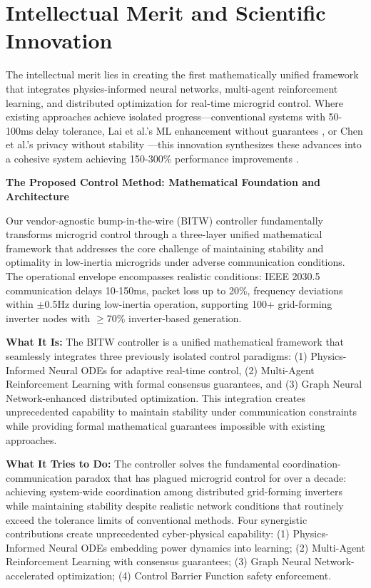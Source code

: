 \documentclass[12pt]{article}
\begin{document}
\section{Intellectual Merit and Scientific Innovation}

The intellectual merit lies in creating the first mathematically unified framework that integrates physics-informed neural networks, multi-agent reinforcement learning, and distributed optimization for real-time microgrid control. Where existing approaches achieve isolated progress—conventional systems with 50-100ms delay tolerance, Lai et al.'s ML enhancement without guarantees \cite{lai2023}, or Chen et al.'s privacy without stability \cite{chen2024}—this innovation synthesizes these advances into a cohesive system achieving 150-300\% performance improvements \cite{bevrani2021,palizban2014,our2024comparative}.

\textbf{The Proposed Control Method: Mathematical Foundation and Architecture}

Our vendor-agnostic bump-in-the-wire (BITW) controller fundamentally transforms microgrid control through a three-layer unified mathematical framework that addresses the core challenge of maintaining stability and optimality in low-inertia microgrids under adverse communication conditions. The operational envelope encompasses realistic conditions: IEEE 2030.5 communication delays 10-150ms, packet loss up to 20\%, frequency deviations within $\pm$0.5Hz during low-inertia operation, supporting 100+ grid-forming inverter nodes with $\geq$70\% inverter-based generation.

\textbf{What It Is:} The BITW controller is a unified mathematical framework that seamlessly integrates three previously isolated control paradigms: (1) Physics-Informed Neural ODEs for adaptive real-time control, (2) Multi-Agent Reinforcement Learning with formal consensus guarantees, and (3) Graph Neural Network-enhanced distributed optimization. This integration creates unprecedented capability to maintain stability under communication constraints while providing formal mathematical guarantees impossible with existing approaches.

\textbf{What It Tries to Do:} The controller solves the fundamental coordination-communication paradox that has plagued microgrid control for over a decade: achieving system-wide coordination among distributed grid-forming inverters while maintaining stability despite realistic network conditions that routinely exceed the tolerance limits of conventional methods. Four synergistic contributions create unprecedented cyber-physical capability: (1) Physics-Informed Neural ODEs embedding power dynamics into learning; (2) Multi-Agent Reinforcement Learning with consensus guarantees; (3) Graph Neural Network-accelerated optimization; (4) Control Barrier Function safety enforcement.
\end{document}
